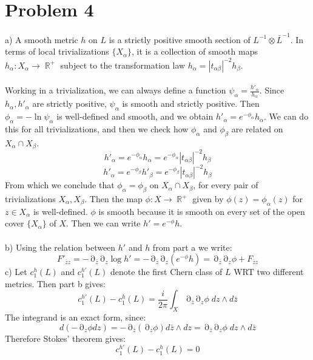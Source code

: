 \documentclass[12 pt]{article}
\DeclareMathOperator {\p} {\partial}
\DeclareMathOperator {\R} {\mathbb{R}}
\theoremstyle{plain}
\theoremstyle{definition}
\theoremstyle{remark}
\begin{document}
\section*{Problem 4}
a) A smooth metric $h$ on $L$ is a strictly positive smooth section of $L^{-1} \otimes \bar L^{-1}$. In terms of local trivializations $\{X_{\alpha}\}$, it is a collection of smooth maps $h_{\alpha} : X_{\alpha} \to \R^+$ subject to the transformation law $h_{\alpha} = |t_{\alpha \beta}|^{-2} h_{\beta}$.
\\
\\
Working in a trivialization, we can always define a function $\psi_{\alpha} = \frac{h'_{\alpha}}{h_{\alpha}}$. Since $h_{\alpha},h'_{\alpha}$ are strictly positive, $\psi_{\alpha}$ is smooth and strictly positive. Then $\phi_{\alpha} = - \ln \psi_{\alpha}$ is well-defined and smooth, and we obtain $h'_{\alpha} = e^{-\phi_{\alpha}} h_{\alpha}$. We can do this for all trivializations, and then we check how $\phi_{\alpha}$ and $\phi_{\beta}$ are related on $X_{\alpha} \cap X_{\beta}$.
\[        h'_{\alpha} =  e^{-\phi_{\alpha}} h_{\alpha} =  e^{-\phi_{\alpha}} |t_{\alpha \beta}|^{-2} h_{\beta}    \]
\[        h'_{\alpha} = e^{- \phi_{\beta}} h'_{\beta} =   e^{- \phi_{\beta}}   |t_{\alpha \beta}|^{-2} h_{\beta}      \]
From which we conclude that $\phi_{\alpha} = \phi_{\beta}$ on $X_{\alpha} \cap X_{\beta}$, for every pair of trivializations $X_{\alpha}, X_{\beta}$. Then the map $\phi : X \to \R^+$ given by $\phi(z) = \phi_{\alpha}(z)$ for $z\in X_{\alpha}$ is well-defined. $\phi$ is smooth because it is smooth on every set of the open cover $\{X_{\alpha}\}$ of $X$. Then we can write $h' = e^{-\phi} h$.
\\
\\
b) Using the relation between $h'$ and $h$ from part a we write:
 \[      F'_{\bar z z} = - \p_{\bar z}  \p_{z} \log h' = - \p_{\bar z} \p_{z} (e^{-\phi} h) = \p_{\bar z} \p_z \phi + F_{\bar z z}      \]
c) Let $c_1^h(L)$ and $c_1^{h'}(L)$ denote the first Chern class of $L$ WRT two different metrics. Then part b gives:
\[    c_1^{h'}(L) - c_1^h(L) = \frac{i}{2\pi} \int_X \p_{\bar z} \p_z \phi\; dz \wedge d\bar z     \]
The integrand is an exact form, since:
\[      d ( - \p_z \phi dz) = - \p_{\bar z} ( \p_z \phi) d\bar z \wedge dz =  \p_{\bar z} \p_z \phi\; dz \wedge d\bar z    \]
Therefore Stokes' theorem gives:
\[         c_1^{h'}(L) - c_1^h(L) = 0       \]
\end{document}
